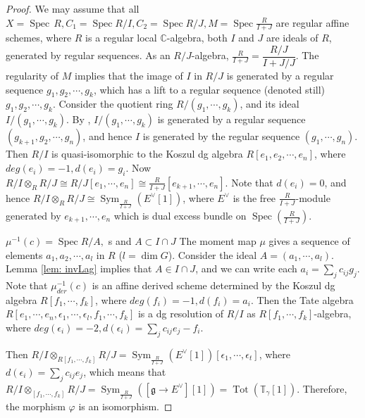 \documentclass[12pt]{amsart}
\theoremstyle{definition}
\theoremstyle{remark}
\newtheorem{remark}[theorem]{Remark}
\numberwithin{equation}{section}
\newcommand{\CC}{\mathbb{C}}
\newcommand{\TT}{\mathbb{T}}
\newcommand{\Spec}{\operatorname{Spec}}
\newcommand{\Sym}{\operatorname{Sym}}
\newcommand{\Tot}{\operatorname{Tot}}
\newcommand{\arw}{\longrightarrow}
\begin{document}
\begin{proof}
We may assume that all $X=\Spec\,R, C_1=\Spec R/I, C_2=\Spec R/J, M=\Spec \frac{R}{I+J}$ are regular affine schemes, where $R$ is a regular local $\CC$-algebra, both $I$ and $J$ are ideals of $R$, generated by regular sequences. As an $R/J$-algebra, $\frac{R}{I+J}=\dfrac{R/J}{I+J/J}$. The regularity of $M$ implies that the image of $I$ in $R/J$ is generated by a regular sequence $g_1, g_2, \cdots, g_k$, which has a lift to a regular sequence (denoted still) $g_1, g_2, \cdots, g_k$. Consider the quotient ring $R/(g_1, \cdots, g_k)$, and its ideal $I/(g_1,\cdots, g_k)$. By \cite{vasconcelos1967ideals}, $I/(g_1,\cdots, g_k)$ is generated by a regular sequence $(g_{k+1}, g_2,\cdots, g_n)$, and hence $I$ is generated by the regular sequence $(g_1, \cdots, g_n)$. Then $R/I$ is quasi-isomorphic to the Koszul dg algebra $R[e_1, e_2, \cdots, e_{n}]$, where $deg(e_i)=-1, d(e_i)=g_i$. Now $R/I\otimes_R R/J\cong R/J[e_1, \cdots, e_n]\cong \frac{R}{I+J}[e_{k+1}, \cdots, e_n]$. Note that $d(e_i)=0$, and hence $R/I\otimes_R R/J\cong \Sym_{\frac{R}{I+J}}(E^{\vee}[1])$, where $E^{\vee}$ is the free $\frac{R}{I+J}$-module generated by $e_{k+1},\cdots, e_n$ which is dual excess bundle on $\Spec(\frac{R}{I+J})$.  


$\mu^{-1}(c)=\Spec R/A,$ s and $A\subset I\cap J$
The moment map $\mu$ gives a sequence of elements $a_1, a_2, \cdots, a_l$ in $R$ ($l=\dim G$). Consider the ideal $A=(a_1, \cdots, a_l)$. Lemma \ref{lem: invLag} implies that $A\in I\cap J$, and we can write each $a_i=\sum_{j}c_{ij}g_j$. Note that $\mu_{der}^{-1}(c)$ is an affine derived scheme determined by the Koszul dg algebra $R[f_1, \cdots, f_k]$, where $deg (f_i)=-1, d(f_i)=a_i$. Then the Tate algebra $R[e_1, \cdots, e_n,\epsilon_1, \cdots, \epsilon_l, f_1, \cdots, f_k]$ is a dg resolution of $R/I$ as $R[f_1, \cdots, f_k]$-algebra, where $deg(\epsilon_i)=-2, d(\epsilon_i)=\sum_j c_{ij}e_j-f_i$. 
 
 Then $R/I\otimes_{R[f_1, \cdots, f_k]} R/J=\Sym_{\frac{R}{I+J}}(E^{\vee}[1])[\epsilon_1, \cdots, \epsilon_t]$, where $d(\epsilon_i)=\sum_j c_{ij}e_j$, which means that $R/I\otimes_{[f_1, \cdots, f_k]} R/J=\Sym_{\frac{R}{I+J}}([\mathfrak{g}\arw E^{\vee}][1])=\Tot(\TT_{\gamma}[1])$. Therefore, the morphism $\varphi$ is an isomorphism. 
\end{proof}

\end{document}
